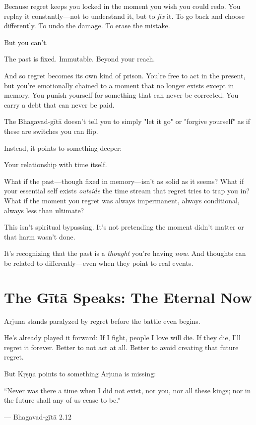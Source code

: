 \documentclass[11pt,twoside]{book}
\begin{document}
Because regret keeps you locked in the moment you wish you could redo. You replay it constantly—not to understand it, but to \emph{fix} it. To go back and choose differently. To undo the damage. To erase the mistake.

But you can't.

The past is fixed. Immutable. Beyond your reach.

And so regret becomes its own kind of prison. You're free to act in the present, but you're emotionally chained to a moment that no longer exists except in memory. You punish yourself for something that can never be corrected. You carry a debt that can never be paid.

The Bhagavad-gītā doesn't tell you to simply "let it go" or "forgive yourself" as if these are switches you can flip.

Instead, it points to something deeper:

Your relationship with time itself.

What if the past—though fixed in memory—isn't as solid as it seems? What if your essential self exists \emph{outside} the time stream that regret tries to trap you in? What if the moment you regret was always impermanent, always conditional, always less than ultimate?

This isn't spiritual bypassing. It's not pretending the moment didn't matter or that harm wasn't done.

It's recognizing that the past is a \emph{thought} you're having \emph{now}. And thoughts can be related to differently—even when they point to real events.

\section*{The Gītā Speaks: The Eternal Now}

Arjuna stands paralyzed by regret before the battle even begins.

He's already played it forward: If I fight, people I love will die. If they die, I'll regret it forever. Better to not act at all. Better to avoid creating that future regret.

But Kṛṣṇa points to something Arjuna is missing:

\begin{pullquote}
``Never was there a time when I did not exist, nor you, nor all these kings; nor in the future shall any of us cease to be.''

--- Bhagavad-gītā 2.12
\end{pullquote}
\end{document}

